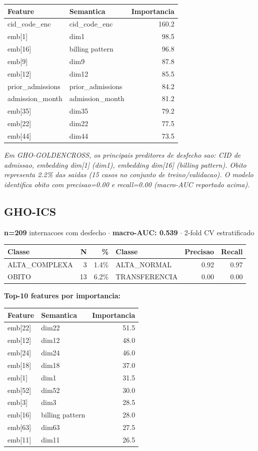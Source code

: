 \documentclass[11pt,a4paper]{article}
\begin{document}
\begin{tabular}{llr}
\toprule
Feature & Semantica & Importancia \\
\midrule
cid\_code\_enc & cid\_code\_enc & 160.2 \\
emb[1] & dim1 & 98.5 \\
emb[16] & billing pattern & 96.8 \\
emb[9] & dim9 & 87.8 \\
emb[12] & dim12 & 85.5 \\
prior\_admissions & prior\_admissions & 84.2 \\
admission\_month & admission\_month & 81.2 \\
emb[35] & dim35 & 79.2 \\
emb[22] & dim22 & 77.5 \\
emb[44] & dim44 & 73.5 \\
\bottomrule
\end{tabular}

\vspace{4pt}\noindent\textit{Em GHO-GOLDENCROSS, os principais preditores de desfecho sao: CID de admissao, embedding dim[1] (dim1), embedding dim[16] (billing pattern). Obito representa 2.2\% das saidas (15 casos no conjunto de treino/validacao). O modelo identifica obito com precisao=0.00 e recall=0.00 (macro-AUC reportado acima).}

\subsection{GHO-ICS}
\textbf{n=209} internacoes com desfecho $\cdot$ \textbf{macro-AUC: 0.539} $\cdot$ 2-fold CV estratificado

\begin{tabular}{lrr|lrr}
\toprule
Classe & N & \% & Classe & Precisao & Recall \\
\midrule
ALTA\_COMPLEXA & 3 & 1.4\% & ALTA\_NORMAL & 0.92 & 0.97 \\
OBITO & 13 & 6.2\% & TRANSFERENCIA & 0.00 & 0.00 \\
\bottomrule
\end{tabular}

\vspace{4pt}\noindent\textbf{Top-10 features por importancia:}

\begin{tabular}{llr}
\toprule
Feature & Semantica & Importancia \\
\midrule
emb[22] & dim22 & 51.5 \\
emb[12] & dim12 & 48.0 \\
emb[24] & dim24 & 46.0 \\
emb[18] & dim18 & 37.0 \\
emb[1] & dim1 & 31.5 \\
emb[52] & dim52 & 30.0 \\
emb[3] & dim3 & 28.5 \\
emb[16] & billing pattern & 28.0 \\
emb[63] & dim63 & 27.5 \\
emb[11] & dim11 & 26.5 \\
\bottomrule
\end{tabular}
\end{document}
